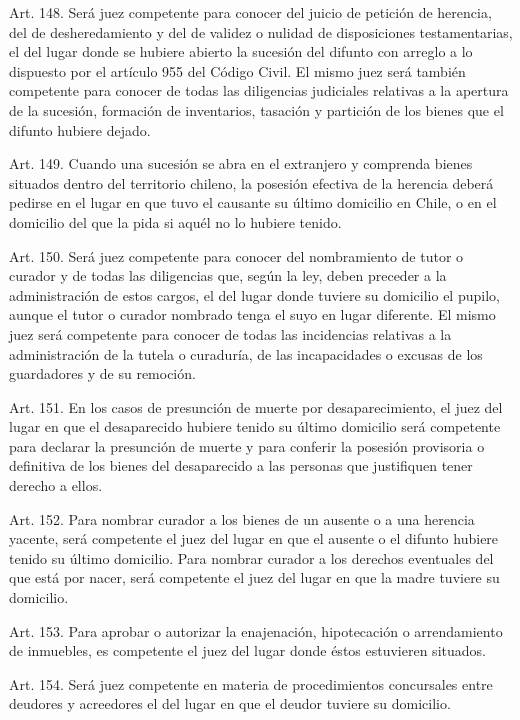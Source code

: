     Art. 148. Será juez competente para conocer del juicio de petición de herencia, del de desheredamiento y del de validez o nulidad de disposiciones testamentarias, el del lugar donde se hubiere abierto la sucesión del difunto con arreglo a lo dispuesto por el artículo 955 del Código Civil.
    El mismo juez será también competente para conocer de todas las diligencias judiciales relativas a la apertura de la sucesión, formación de inventarios, tasación y partición de los bienes que el difunto hubiere dejado.


    Art. 149. Cuando una sucesión se abra en el extranjero y comprenda bienes situados dentro del territorio chileno, la posesión efectiva de la herencia deberá pedirse en el lugar en que tuvo el causante su último domicilio en Chile, o en el domicilio del que la pida si aquél no lo hubiere tenido.

    Art. 150. Será juez competente para conocer del nombramiento de tutor o curador y de todas las diligencias que, según la ley, deben preceder a la administración de estos cargos, el del lugar donde tuviere su domicilio el pupilo, aunque el tutor o curador nombrado tenga el suyo en lugar diferente.
    El mismo juez será competente para conocer de todas las incidencias relativas a la administración de la tutela o curaduría, de las incapacidades o excusas de los guardadores y de su remoción.


    Art. 151. En los casos de presunción de muerte por desaparecimiento, el juez del lugar en que el desaparecido hubiere tenido su último domicilio será competente para declarar la presunción de muerte y para conferir la posesión provisoria o definitiva de los bienes del desaparecido a las personas que justifiquen tener derecho a ellos.

    Art. 152. Para nombrar curador a los bienes de un ausente o a una herencia yacente, será competente el juez del lugar en que el ausente o el difunto hubiere tenido su último domicilio.
    Para nombrar curador a los derechos eventuales del que está por nacer, será competente el juez del lugar en que la madre tuviere su domicilio.


    Art. 153. Para aprobar o autorizar la enajenación, hipotecación o arrendamiento de inmuebles, es competente el juez del lugar donde éstos estuvieren situados.


    Art. 154. Será juez competente en materia de procedimientos concursales entre deudores y acreedores el del lugar en que el deudor tuviere su domicilio.



